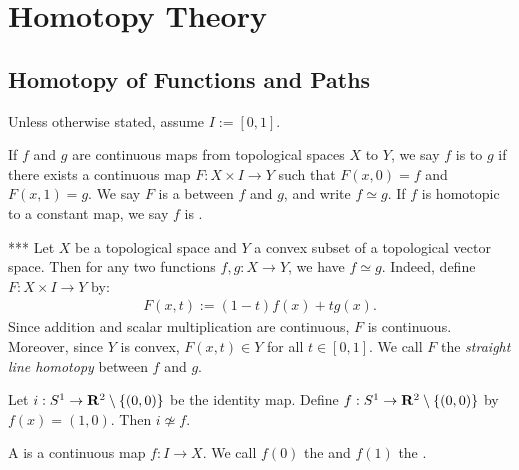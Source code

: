 \chapter{Homotopy Theory}

\section{Homotopy of Functions and Paths}

Unless otherwise stated, assume $I:=[0,1]$.

\begin{definition}
    If $f$ and $g$ are continuous maps from topological spaces $X$ to $Y$, we say $f$ is  to $g$ if there exists a continuous map $F:X \times I \rightarrow Y$ such that $F(x,0) = f$ and $F(x,1) = g$. We say $F$ is a  between $f$ and $g$, and write $f \simeq g$. If $f$ is homotopic to a constant map, we say $f$ is .
\end{definition}

\begin{example}{\color{red}***}
    Let $X$ be a topological space and $Y$ a convex subset of a topological vector space. Then for any two functions $f,g:X \rightarrow Y$, we have $f \simeq g$. Indeed, define $F:X \times I \rightarrow Y$ by:
        \begin{equation*}
        \begin{split}
            F(x,t) := (1-t)f(x) + tg(x).
        \end{split}
        \end{equation*}
    Since addition and scalar multiplication are continuous, $F$ is continuous. Moreover, since $Y$ is convex, $F(x,t) \in Y$ for all $t \in [0,1]$. We call $F$ the \textit{straight line homotopy} between $f$ and $g$.
\end{example}

\begin{example}
    Let $i:S^1 \rightarrow \mathbf{R}^2 \setminus \{(0,0)\}$ be the identity map. Define $f:S^1 \rightarrow \mathbf{R}^2 \setminus \{(0,0)\}$ by $f(x) = (1,0)$. Then $i \not\simeq f$.
\end{example}

\begin{definition}
    A  is a continuous map $f:I \rightarrow X$. We call $f(0)$ the  and $f(1)$ the .
\end{definition}

